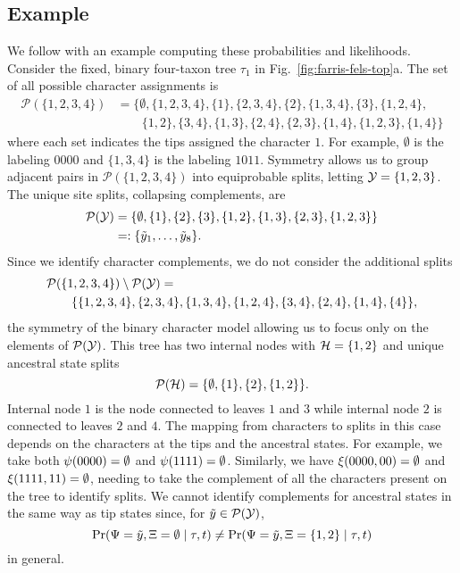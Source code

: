 \subsection*{Example}
We follow with an example computing these probabilities and likelihoods.
Consider the fixed, binary four-taxon tree $\tau_1$ in Fig.~\ref{fig:farris-fels-top}a.
The set of all possible character assignments is
\begin{align*}
\mathcal{P}(\{1,2,3,4\}) &= \{\emptyset, \{1,2,3,4\}, \{1\}, \{2,3,4\}, \{2\}, \{1,3,4\}, \{3\}, \{1,2,4\}, \\
                         &\qquad \{1,2\}, \{3,4\}, \{1,3\}, \{2,4\}, \{2,3\}, \{1,4\}, \{1,2,3\}, \{1,4\}\}
\end{align*}
where each set indicates the tips assigned the character $1$.
For example, $\emptyset$ is the labeling $0000$ and $\{1,3,4\}$ is the labeling $1011$.
Symmetry allows us to group adjacent pairs in $\mathcal{P}(\{1,2,3,4\})$ into equiprobable splits, letting $\mathcal{Y}=\{1,2,3\}$.
The unique site splits, collapsing complements, are
\begin{align*}
    \mathcal{P}(\mathcal{Y}) &= \{\emptyset, \{1\}, \{2\}, \{3\}, \{1,2\}, \{1,3\}, \{2,3\}, \{1,2,3\}\} \\
& =: \{\tilde{y}_1, \ldots, \tilde{y}_8\}.
\end{align*}
Since we identify character complements, we do not consider the additional splits
\begin{equation*}
\begin{split}
& \mathcal{P}(\{1,2,3,4\}) \setminus \mathcal{P}(\mathcal{Y}) = \\
&\qquad \{\{1,2,3,4\}, \{2,3,4\}, \{1,3,4\}, \{1,2,4\}, \{3,4\}, \{2,4\}, \{1,4\}, \{4\}\},
\end{split}
\end{equation*}
the symmetry of the binary character model allowing us to focus only on the elements of $\mathcal{P}(\mathcal{Y})$.
This tree has two internal nodes with $\mathcal{H}=\{1,2\}$ and unique ancestral state splits
\[
\mathcal{P}(\mathcal{H}) = \{\emptyset, \{1\}, \{2\}, \{1,2\}\}.
\]
Internal node $1$ is the node connected to leaves $1$ and $3$ while internal node $2$ is connected to leaves $2$ and $4$.
The mapping from characters to splits in this case depends on the characters at the tips and the ancestral states.
For example, we take both $\psi(0000)=\emptyset$ and $\psi(1111)=\emptyset$.
Similarly, we have $\xi(0000, 00) = \emptyset$ and $\xi(1111, 11)=\emptyset$, needing to take the complement of all the characters present on the tree to identify splits.
We cannot identify complements for ancestral states in the same way as tip states since, for $\tilde{y}\in\mathcal{P}(\mathcal{Y})$,
\[
\Pr(\Psi=\tilde{y}, \Xi=\emptyset \mid \tau, t)\neq \Pr(\Psi=\tilde{y}, \Xi=\{1,2\} \mid \tau, t)
\]
in general.


